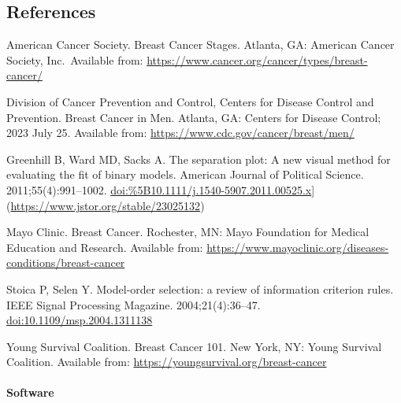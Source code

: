 \documentclass[
]{article}
\begin{document}
\hypertarget{references}{%
\subsection{References}\label{references}}

American Cancer Society. Breast Cancer Stages. Atlanta, GA: American
Cancer Society, Inc.~Available from:
\href{https://www.cancer.org/cancer/types/breast-cancer/understanding-a-breast-cancer-diagnosis/stages-of-breast-cancer.html\#:~:text=The\%20earliest\%20stage\%20breast\%20cancers,means\%20cancer\%20has\%20spread\%20more.}{https://www.cancer.org/cancer/types/breast-cancer/}

Division of Cancer Prevention and Control, Centers for Disease Control
and Prevention. Breast Cancer in Men. Atlanta, GA: Centers for Disease
Control; 2023 July 25. Available from:
\href{https://www.cdc.gov/cancer/breast/men/index.htm\#:~:text=Breast\%20cancer\%20is\%20most\%20often,is\%20found\%20in\%20a\%20man.\&text=Invasive\%20ductal\%20carcinoma.,parts\%20of\%20the\%20breast\%20tissue.}{https://www.cdc.gov/cancer/breast/men/}

Greenhill B, Ward MD, Sacks A. The separation plot: A new visual method
for evaluating the fit of binary models. American Journal of Political
Science. 2011;55(4):991--1002.
\url{doi:\%5B10.1111/j.1540-5907.2011.00525.x}{]}(\url{https://www.jstor.org/stable/23025132})

Mayo Clinic. Breast Cancer. Rochester, MN: Mayo Foundation for Medical
Education and Research. Available from:
\href{https://www.mayoclinic.org/diseases-conditions/breast-cancer/symptoms-causes/syc-20352470}{https://www.mayoclinic.org/diseases-conditions/breast-cancer}

Stoica P, Selen Y. Model-order selection: a review of information
criterion rules. IEEE Signal Processing Magazine. 2004;21(4):36--47.
\href{https://ieeexplore.ieee.org/document/1311138}{doi:10.1109/msp.2004.1311138}

Young Survival Coalition. Breast Cancer 101. New York, NY: Young
Survival Coalition. Available from:
\href{https://youngsurvival.org/breast-cancer-101?gad_source=1\&gclid=CjwKCAiAg9urBhB_EiwAgw88mcI-WsyaKEn-nTaWET71dtNVebk2y3qHMeLMjBnxk42z-sE5LMbPPRoCLZYQAvD_BwE}{https://youngsurvival.org/breast-cancer}

\hypertarget{software}{%
\paragraph{Software}\label{software}}
\end{document}
